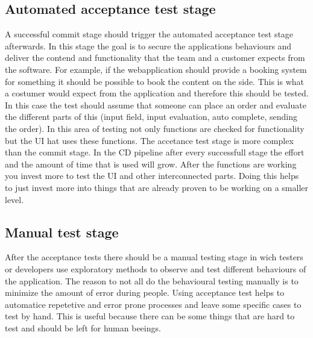 \subsection{Automated acceptance test stage}
A successful commit stage should trigger the automated acceptance test stage afterwards. In this stage the goal is to secure the applications behaviours and
deliver the contend and functionality that the team and a customer expects from the software. For example, if the webapplication should provide a booking system
for something it should be possible to book the content on the side. This is what a costumer would expect from the application and therefore this should be
tested. In this case the test should assume that someone can place an order and evaluate the different parts of this (input field, input evaluation, auto
complete, sending the order). In this area of testing not only functions are checked for functionality but the UI hat uses these functions. The accetance test
stage is more complex than the commit stage. In the CD pipeline after every successfull stage the effort and the amount of time that is used will grow.
After the functions are working you invest more to test the UI and other interconnected parts. Doing this helps to just invest more into things that are
already proven to be working on a smaller level.

\subsection{Manual test stage}
After the acceptance tests there should be a manual testing stage in wich testers or developers use exploratory methods to observe and test different behaviours
of the application. The reason to not all do the behavioural testing manually is to minimize the amount of error during people. Using acceptance test helps
to automatice repetetive and error prone processes and leave some specific cases to test by hand. This is useful because there can be some things that are hard
to test and should be left for human beeings.

